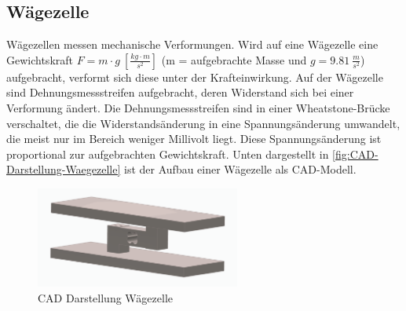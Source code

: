 \subsection{Wägezelle}
Wägezellen messen mechanische Verformungen.
Wird auf eine Wägezelle eine Gewichtskraft \mbox{$F = m \cdot g \: [\frac{kg \cdot m}{s^2}]$} (m = aufgebrachte Masse und $g = 9.81 \: \frac{m}{s^2}$)  aufgebracht, verformt sich diese unter der Krafteinwirkung.
Auf der Wägezelle sind Dehnungsmessstreifen aufgebracht, deren Widerstand sich bei einer Verformung ändert.
Die Dehnungsmessstreifen sind in einer Wheatstone-Brücke verschaltet, die die Widerstandsänderung in eine Spannungsänderung umwandelt, die meist nur im Bereich weniger Millivolt liegt.
Diese Spannungsänderung ist proportional zur aufgebrachten Gewichtskraft.
Unten dargestellt in \autoref{fig:CAD-Darstellung-Waegezelle} ist der Aufbau einer Wägezelle als CAD-Modell. \\
\begin{figure}[h!]
    \centering
    \includegraphics[width=0.6\textwidth]{img/CAD_Waegezelle.png}
    \caption{CAD Darstellung Wägezelle}
    \label{fig:CAD-Darstellung-Waegezelle}
\end{figure}

